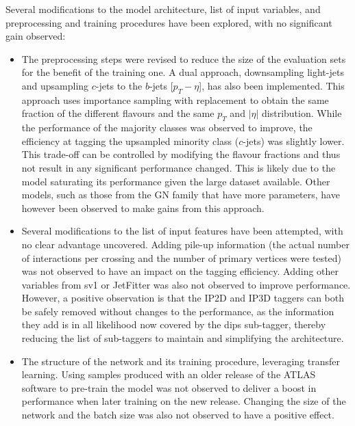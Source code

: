 Several modifications to the model architecture, list of input variables, and preprocessing and training procedures have been explored, with no significant gain observed:
\begin{itemize}
\item The preprocessing steps were revised to reduce the size of the evaluation sets for the benefit of the training one. A dual approach, downsampling light-jets and upsampling $c$-jets to the $b$-jets [$p_T - \eta$], has also been implemented. This approach uses importance sampling with replacement to obtain the same fraction of the different flavours and the same $p_T$ and $|\eta|$ distribution. While the performance of the majority classes was observed to improve, the efficiency at tagging the upsampled minority class ($c$-jets) was slightly lower. This trade-off can be controlled by modifying the flavour fractions and thus not result in any significant performance changed. This is likely due to the model saturating its performance given the large dataset available. Other models, such as those from the GN family that have more parameters, have however been observed to make gains from this approach.
\item Several modifications to the list of input features have been attempted, with no clear advantage uncovered. Adding pile-up information (the actual number of interactions per crossing and the number of primary vertices were tested) was not observed to have an impact on the tagging efficiency. Adding other variables from \gls{sv1} or JetFitter was also not observed to improve performance. However, a positive observation is that the IP2D and IP3D taggers can both be safely removed without changes to the performance, as the information they add is in all likelihood now covered by the \gls{dips} sub-tagger, thereby reducing the list of sub-taggers to maintain and simplifying the architecture.
\item The structure of the network and its training procedure, leveraging transfer learning. Using samples produced with an older release of the ATLAS software to pre-train the model was not observed to deliver a boost in performance when later training on the new release. Changing the size of the network and the batch size was also not observed to have a positive effect.
\end{itemize}

